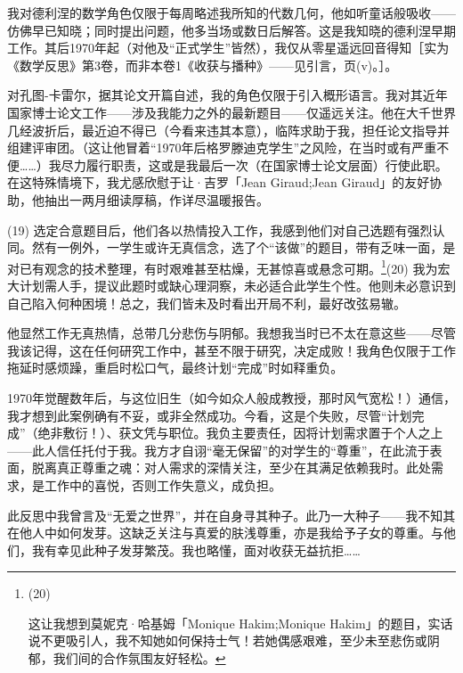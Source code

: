 {我对德利涅的数学角色仅限于每周略述我所知的代数几何，他如听童话般吸收——仿佛早已知晓；同时提出问题，他多当场或数日后解答。这是我知晓的德利涅早期工作。其后1970年起（对他及“正式学生”皆然），我仅从零星遥远回音得知［实为《数学反思》第3卷，而非本卷1《收获与播种》——见引言，页(v)。］。

对孔图-卡雷尔，据其论文开篇自述，我的角色仅限于引入概形语言。我对其近年国家博士论文工作——涉及我能力之外的最新题目——仅遥远关注。他在大千世界几经波折后，最近迫不得已（今看来违其本意），临阵求助于我，担任论文指导并组建评审团。（这让他冒着“1970年后格罗滕迪克学生”之风险，在当时或有严重不便……）我尽力履行职责，这或是我最后一次（在国家博士论文层面）行使此职。在这特殊情境下，我尤感欣慰于让·吉罗「Jean Giraud;Jean Giraud」的友好协助，他抽出一两月细读厚稿，作详尽温暖报告。}(19) 选定合意题目后，他们各以热情投入工作，我感到他们对自己选题有强烈认同。然有一例外，一学生或许无真信念，选了个“该做”的题目，带有乏味一面，是对已有观念的技术整理，有时艰难甚至枯燥，无甚惊喜或悬念可期。\footnote{(20)\par 这让我想到莫妮克·哈基姆「Monique Hakim;Monique Hakim」的题目，实话说不更吸引人，我不知她如何保持士气！若她偶感艰难，至少未至悲伤或阴郁，我们间的合作氛围友好轻松。}(20) 我为宏大计划需人手，提议此题时或缺心理洞察，未必适合此学生个性。他则未必意识到自己陷入何种困境！总之，我们皆未及时看出开局不利，最好改弦易辙。

他显然工作无真热情，总带几分悲伤与阴郁。我想我当时已不太在意这些——尽管我该记得，这在任何研究工作中，甚至不限于研究，决定成败！我角色仅限于工作拖延时感烦躁，重启时松口气，最终计划“完成”时如释重负。

1970年觉醒数年后，与这位旧生（如今如众人般成教授，那时风气宽松！）通信，我才想到此案例确有不妥，或非全然成功。今看，这是个失败，尽管“计划完成”（绝非敷衍！）、获文凭与职位。我负主要责任，因将计划需求置于个人之上——此人信任托付于我。我方才自诩“毫无保留”的对学生的“尊重”，在此流于表面，脱离真正尊重之魂：对人需求的深情关注，至少在其满足依赖我时。此处需求，是工作中的喜悦，否则工作失意义，成负担。

此反思中我曾言及“无爱之世界”，并在自身寻其种子。此乃一大种子——我不知其在他人中如何发芽。这缺乏关注与真爱的肤浅尊重，亦是我给予子女的尊重。与他们，我有幸见此种子发芽繁茂。我也略懂，面对收获无益抗拒……